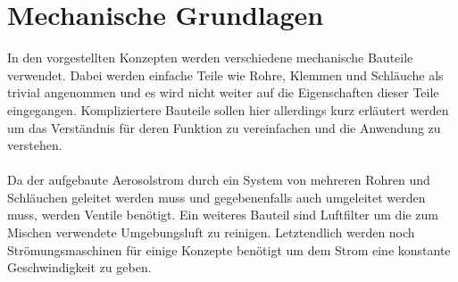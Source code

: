 \section{Mechanische Grundlagen}
In den vorgestellten Konzepten werden verschiedene mechanische Bauteile verwendet. Dabei werden einfache Teile wie Rohre, Klemmen und Schl\"{a}uche als trivial angenommen und es wird nicht weiter auf die Eigenschaften dieser Teile eingegangen. Kompliziertere Bauteile sollen hier allerdings kurz erl\"{a}utert werden um das Verst\"{a}ndnis f\"{u}r deren Funktion zu vereinfachen und die Anwendung zu verstehen.
\\\\
Da der aufgebaute Aerosolstrom durch ein System von mehreren Rohren und Schl\"{a}uchen geleitet werden muss und gegebenenfalls auch umgeleitet werden muss, werden Ventile ben\"{o}tigt. Ein weiteres Bauteil sind Luftfilter um die zum Mischen verwendete Umgebungsluft zu reinigen. Letztendlich werden noch Str\"{o}mungsmaschinen f\"{u}r einige Konzepte ben\"{o}tigt um dem Strom eine konstante Geschwindigkeit zu geben.

